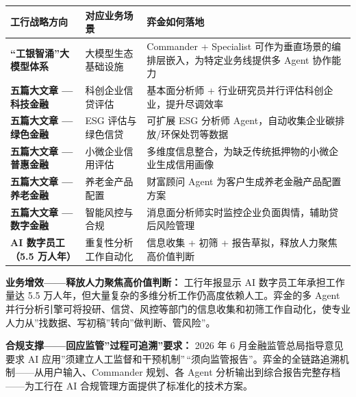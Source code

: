 \documentclass[
]{ctexart}
\begin{document}
\begin{longtable}[]{@{}
  >{\raggedright\arraybackslash}p{}
  >{\raggedright\arraybackslash}p{}
  >{\raggedright\arraybackslash}p{}@{}}
\toprule\noalign{}
\begin{minipage}[b]{\linewidth}\raggedright
工行战略方向
\end{minipage} & \begin{minipage}[b]{\linewidth}\raggedright
对应业务场景
\end{minipage} & \begin{minipage}[b]{\linewidth}\raggedright
弈金如何落地
\end{minipage} \\
\midrule\noalign{}
\endhead
\bottomrule\noalign{}
\endlastfoot
\textbf{``工银智涌''大模型体系} & 大模型生态基础设施 & Commander +
Specialist 可作为垂直场景的编排层嵌入，为特定业务线提供多 Agent
协作能力 \\
\textbf{五篇大文章 --- 科技金融} & 科创企业信贷评估 & 基本面分析师 +
行业研究员并行评估科创企业，提升尽调效率 \\
\textbf{五篇大文章 --- 绿色金融} & ESG 评估与绿色信贷 & 可扩展 ESG
分析师 Agent，自动收集企业碳排放/环保处罚等数据 \\
\textbf{五篇大文章 --- 普惠金融} & 小微企业信用评估 &
多维度信息整合，为缺乏传统抵押物的小微企业生成信用画像 \\
\textbf{五篇大文章 --- 养老金融} & 养老金产品配置 & 财富顾问 Agent
为客户生成养老金融产品配置方案 \\
\textbf{五篇大文章 --- 数字金融} & 智能风控与合规 &
消息面分析师实时监控企业负面舆情，辅助贷后风险管理 \\
\textbf{AI 数字员工（5.5 万人年）} & 重复性分析工作自动化 & 信息收集 +
初筛 + 报告草拟，释放人力聚焦高价值判断 \\
\end{longtable}


\textbf{业务增效------释放人力聚焦高价值判断：} 工行年报显示 AI
数字员工年承担工作量达 5.5
万人年，但大量复杂的多维分析工作仍高度依赖人工。弈金的多 Agent
并行分析引擎可将投研、信贷、风控等部门的信息收集和初筛工作自动化，使专业人力从''找数据、写初稿''转向''做判断、管风险''。

\textbf{合规支撑------回应监管''过程可追溯''要求：} 2026 年 6
月金融监管总局指导意见要求 AI
应用''须建立人工监督和干预机制''\,``须向监管报告''。弈金的全链路追溯机制------从用户输入、Commander
规划、各 Agent 分析输出到综合报告完整存档------为工行在 AI
合规管理方面提供了标准化的技术方案。
\end{document}
